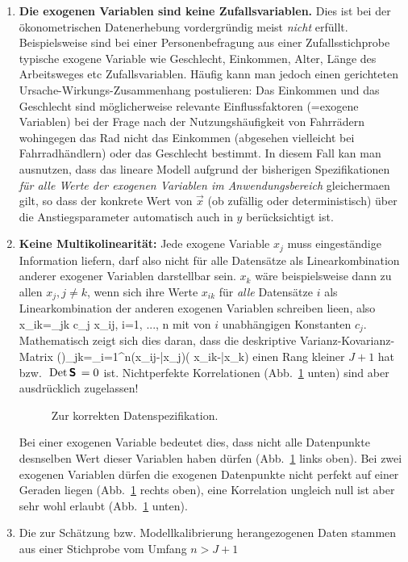 \begin{enumerate}
\item  \textbf{Die exogenen Variablen sind keine Zufallsvariablen.} Dies ist
bei der \"o\-ko\-no\-me\-tri\-schen Datenerhebung vordergr\"undig 
meist  \emph{nicht} erf\"ullt. Beispielsweise sind bei
 einer Personenbefragung aus einer
Zufallsstichprobe typische exogene Variable wie Geschlecht,
Einkommen, Alter, L\"ange des Arbeitsweges etc
Zufallsvariablen. H\"aufig kann man jedoch einen
gerichteten Ursache-Wirkungs-Zusammenhang postulieren: Das Einkommen
und das Geschlecht sind m\"oglicherweise relevante Einflussfaktoren
(=exogene Variablen) bei der Frage nach der Nutzungsh\"aufigkeit von
Fahrr\"adern wohingegen das Rad nicht das Einkommen (abgesehen
vielleicht bei Fahr\-rad\-h\"and\-lern) oder das Geschlecht bestimmt.
In diesem Fall kan man
ausnutzen,  dass das lineare
Modell aufgrund der bisherigen Spezifikationen 
\emph{f\"ur alle Werte der exogenen Variablen im
Anwendungsbereich} gleicherma\3en gilt, so dass der konkrete Wert von
$\vec{x}$ (ob zuf\"allig oder deterministisch) \"uber die
Anstiegsparameter automatisch auch in $y$ ber\"ucksichtigt ist. 

\item \textbf{Keine Multikolinearit\"at:}
Jede exogene Variable $x_j$ muss eingest\"andige Information
liefern, darf also nicht f\"ur alle Datens\"atze als Linearkombination
anderer exogener Variablen darstellbar sein. $x_k$ w\"are
beispielsweise dann  zu allen $x_j, j\neq k$, wenn sich ihre
Werte $x_{ik}$ f\"ur \emph{alle} Datens\"atze $i$ als
Linearkombination der anderen exogenen Variablen schreiben lie\3en,
also
\be
\label{multikoll}
x_{ik}=\sum_{j\neq k} c_j x_{ij}, \quad \forall i=1, ..., n
\ee
mit von $i$ unabh\"angigen Konstanten $c_j$. 
Mathematisch zeigt sich dies
daran, dass die deskriptive Varianz-Kovarianz-Matrix 
\be
\label{Sjk}
()_{jk}=\sum_{i=1}^n(x_{ij}-\bar{x}_j)(
x_{ik}-\bar{x}_k)
\ee
einen Rang kleiner
$J+1$ hat bzw. ${\mbox{ Det}}\,\textbf{\textsf{S}}\,=0$ ist. Nichtperfekte Korrelationen
(Abb.~\ref{fig:spezData} unten) sind
aber ausdr\"ucklich zugelassen! 

\begin{figure}
\caption{\label{fig:spezData}Zur korrekten Datenspezifikation.}
\end{figure}

Bei einer exogenen Variable bedeutet dies, dass nicht alle Datenpunkte
desnselben Wert dieser Variablen haben d\"urfen
(Abb.~\ref{fig:spezData} links oben). Bei zwei exogenen
Variablen d\"urfen die exogenen Datenpunkte nicht perfekt auf einer
Geraden liegen (Abb.~\ref{fig:spezData} rechts oben), eine Korrelation
ungleich null ist aber sehr wohl erlaubt (Abb.~\ref{fig:spezData} unten).
\item Die zur Sch\"atzung bzw. Modellkalibrierung herangezogenen 
Daten stammen aus einer Stichprobe vom Umfang
$n>J+1$


\end{enumerate}

